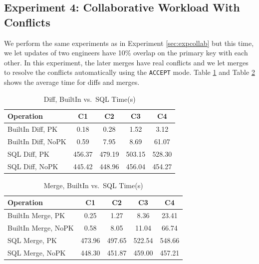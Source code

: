 \documentclass[sigconf,nonacm]{acmart} %
\begin{document}


\subsection{Experiment 4: Collaborative Workload With Conflicts}
We perform the same experiments as in Experiment \ref{sec:expcollab} 
but this time, we let updates of two engineers have 10\% 
overlap on the primary key with each other.  In this experiment, 
the later merges have real conflicts and we let merges to 
resolve the conflicts automatically using the \texttt{ACCEPT} mode.
Table \ref{tab:expdiff42} and Table \ref{tab:expmerge42} shows the average
time for diffs and merges.
\begin{table}[h]
  \centering
  \caption{Diff, BuiltIn vs.\ SQL Time(s)}
  \label{tab:expdiff42}
  \begin{tabular}{lcccc}
    \toprule
    \textbf{Operation} & \textbf{C1} & \textbf{C2} & \textbf{C3} & \textbf{C4} \\
    \midrule
    BuiltIn Diff, PK  & 0.18 & 0.28 & 1.52 & 3.12 \\
    BuiltIn Diff, NoPK  & 0.59 & 7.95 & 8.69 & 61.07 \\
    SQL Diff, PK  & 456.37 & 479.19 & 503.15 & 528.30 \\
    SQL Diff, NoPK  & 445.42 & 448.96 & 456.04 & 454.27 \\
    \bottomrule
  \end{tabular}
\end{table}

\begin{table}[h]
  \centering
  \caption{Merge, BuiltIn vs.\ SQL Time(s)}
  \label{tab:expmerge42}
  \begin{tabular}{lcccc}
    \toprule
    \textbf{Operation} & \textbf{C1} & \textbf{C2} & \textbf{C3} & \textbf{C4} \\
    \midrule
    BuiltIn Merge, PK  & 0.25 & 1.27 & 8.36 & 23.41 \\
    BuiltIn Merge, NoPK  & 0.58 & 8.05 & 11.04 & 66.74 \\
    SQL Merge, PK  & 473.96 & 497.65 & 522.54 & 548.66 \\
    SQL Merge, NoPK  & 448.30 & 451.87 & 459.00 & 457.21 \\
    \bottomrule
  \end{tabular}
\end{table}
\end{document}
